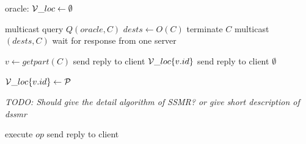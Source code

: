 \begin{algorithm}
\small
\begin{distribalgo}[1]
\vspace{1mm}

    \STATE  oracle: $\mathcal{V}\_loc \leftarrow \emptyset$
\ENDINDENT

\vspace{1.5mm}

	\STATE multicast query $Q(oracle, C)$ \label{algline:query_oracle} 
    \STATE $dests \leftarrow O(C)$ \label{algline:oracle_response} 
    	\STATE terminate $C$ \label{algline:cli_terminate}
    \ELSE
    	\STATE multicast$(dests, C)$ \label{algline:cli_mcast}
    	\STATE wait for response from one server
    \ENDIF
\ENDINDENT

\vspace{1.5mm}

		\STATE $v \leftarrow get part(C)$
			\STATE send reply to client $\mathcal{V}\_loc\{v.id\}$
		\ELSE
			\STATE send reply to client $\emptyset$
		\ENDIF
	\ENDINDENT

		\STATE $\mathcal{V}\_loc\{v.id\} \leftarrow \mathcal{P}$
	\ENDINDENT

\ENDINDENT

\vspace{1.5mm}
\emph{TODO: Should give the detail algorithm of SSMR? or give short description of dssmr}
\vspace{1.5mm}

		\STATE execute $op$ \label{algline:executeopck}
		\STATE send reply to client \label{algline:sendreply}
	\ENDINDENT
\ENDINDENT

	

\end{distribalgo}
\end{algorithm}
